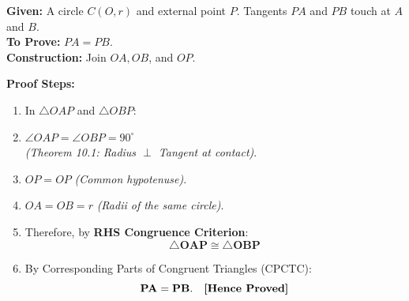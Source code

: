 \documentclass[10pt,a4paper]{article}
\begin{document}
\begin{minipage}[t]{0.54\textwidth}
  \textbf{Given:} A circle $C(O, r)$ and external point $P$. Tangents $PA$ and $PB$ touch at $A$ and $B$.\\
  \textbf{To Prove:} $PA = PB$.\\
  \textbf{Construction:} Join $OA, OB$, and $OP$.

  \vspace{1mm}
  \textbf{Proof Steps:}
  \begin{enumerate}[leftmargin=4.5mm, itemsep=2pt]
    \item In $\triangle OAP$ and $\triangle OBP$:
    \item $\angle OAP = \angle OBP = 90^\circ$ \\
      \textit{(Theorem 10.1: Radius $\perp$ Tangent at contact)}.
    \item $OP = OP$ \quad \textit{(Common hypotenuse)}.
    \item $OA = OB = r$ \quad \textit{(Radii of the same circle)}.
    \item Therefore, by \textbf{RHS Congruence Criterion}:
      \[
        \mathbf{\triangle OAP \cong \triangle OBP}
      \]
    \item By Corresponding Parts of Congruent Triangles (CPCTC):
      \[
        \mathbf{PA = PB}. \quad \text{\textbf{[Hence Proved]}}
      \]
  \end{enumerate}
\end{minipage}\hfill
\end{document}
